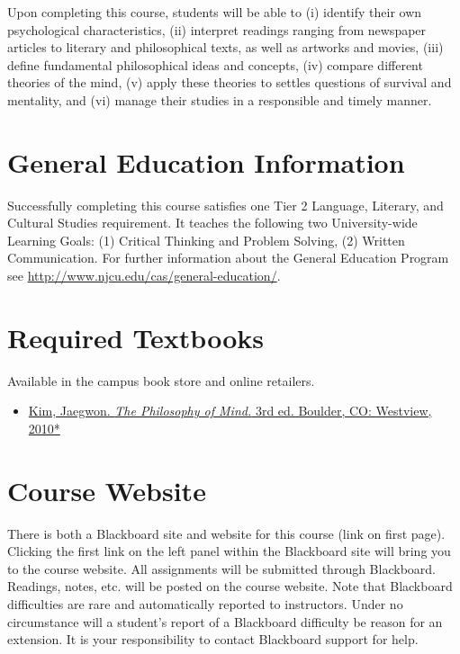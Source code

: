 \documentclass[article,oneside]{memoir}
\begin{document}
Upon completing this course, students will be able to  (i) identify their own psychological characteristics, (ii) interpret readings ranging from newspaper articles to literary and philosophical texts, as well as artworks and movies, (iii) define fundamental philosophical ideas and concepts, (iv) compare different theories of the mind, (v) apply these theories to settles questions of survival and mentality,  and  (vi) manage their studies in a responsible and timely manner. 





\section{General Education Information} 
Successfully completing this course satisfies one Tier 2 Language, Literary, and Cultural Studies requirement. It teaches the following two University-wide Learning Goals: (1) Critical Thinking and Problem Solving, (2) Written Communication. For further information about the General Education Program see \href{http://www.njcu.edu/cas/general-education/}{http://www.njcu.edu/cas/general-education/}.


\section{Required Textbooks}
Available in the campus book store and online retailers.


\begin{itemize}
\item \href{https://www.amazon.com/Philosophy-Mind-Jaegwon-Kim/dp/0813344581/ref=sr_1_1?ie=UTF8&qid=1484684648&sr=8-1&keywords=kim+philosophy+of+mind}{Kim, Jaegwon. \emph{The Philosophy of Mind.} 3rd ed. Boulder, CO: Westview, 2010*}

\end{itemize}


\section{Course Website}
There is both a Blackboard site and website for this course (link on first page). Clicking the first link on the left panel within the Blackboard site will bring you to the course website. All assignments will be submitted through Blackboard. Readings, notes, etc. will be posted on the course website. Note that Blackboard difficulties are rare and automatically reported to instructors. Under no circumstance will a student's report of a Blackboard difficulty be reason for an extension. It is your responsibility to contact Blackboard support for help.
\end{document}
